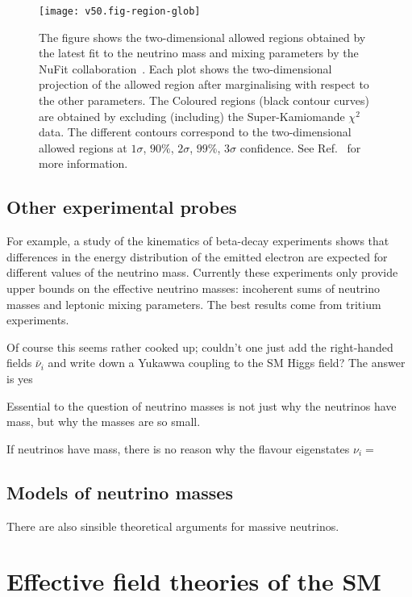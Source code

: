   \begin{figure}[t]
    \centering
    \texttt{[image: v50.fig-region-glob]}
    \caption{The figure shows the two-dimensional allowed regions obtained by
      the latest fit to the neutrino mass and mixing parameters by the NuFit
      collaboration~\cite{Esteban:2020cvm, nufitweb}. Each plot shows the
      two-dimensional projection of the allowed region after marginalising with
      respect to the other parameters. The Coloured regions (black contour
      curves) are obtained by excluding (including) the Super-Kamiomande
      $\chi^{2}$ data. The different contours correspond to the two-dimensional
      allowed regions at $1\sigma$, $90\%$, $2\sigma$, $99\%$, $3\sigma$
      confidence. See Ref.~\cite{nufitweb} for more information.}
    \label{fig:nufit-2d-results}
  \end{figure}

\subsection{Other experimental probes}


For example, a study of the kinematics of beta-decay experiments shows that
differences in the energy distribution of the emitted electron are expected for
different values of the neutrino mass. Currently these experiments only provide
upper bounds on the effective neutrino masses: incoherent sums of neutrino
masses and leptonic mixing parameters. The best results come from tritium
experiments.

Of course this seems rather cooked up; couldn't one just add the right-handed
fields $\bar{\nu}_{i}$ and write down a Yukawwa coupling to the SM Higgs field?
The answer is yes

Essential to the question of neutrino masses is not just why the neutrinos have
mass, but why the masses are so small.

If neutrinos have mass, there is no reason why the flavour eigenstates $\nu_{i} = $

\subsection{Models of neutrino masses}

There are also sinsible theoretical arguments for massive neutrinos.

\section{Effective field theories of the SM}

